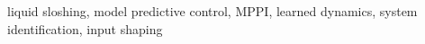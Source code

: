 liquid sloshing, model predictive control, MPPI, learned dynamics, system identification, input shaping
